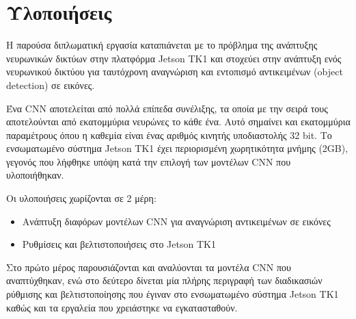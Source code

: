 \chapter{Υλοποιήσεις}
\label{chapter:implementations}

Η παρούσα διπλωματική εργασία καταπιάνεται με το
πρόβλημα της ανάπτυξης νευρωνικών δικτύων στην πλατφόρμα Jetson TK1
και στοχεύει στην ανάπτυξη ενός νευρωνικού δικτύου για ταυτόχρονη
αναγνώριση και εντοπισμό αντικειμένων (object detection) σε εικόνες.

Ένα CNN αποτελείται από πολλά επίπεδα συνέλιξης, τα οποία με την σειρά τους
αποτελούνται από εκατομμύρια νευρώνες το κάθε ένα. Αυτό σημαίνει και εκατομμύρια
παραμέτρους όπου η καθεμία είναι ένας αριθμός κινητής υποδιαστολής 32 bit.
Το ενσωματωμένο σύστημα Jetson TK1 έχει περιορισμένη χωρητικότητα μνήμης (2GB),
γεγονός που λήφθηκε υπόψη κατά την επιλογή των μοντέλων CNN που υλοποιήθηκαν.

Οι υλοποιήσεις χωρίζονται σε 2 μέρη:
\begin{itemize}
  \item{Ανάπτυξη διαφόρων μοντέλων CNN για αναγνώριση αντικειμένων σε εικόνες}
  \item{Ρυθμίσεις και βελτιστοποιήσεις στο Jetson TK1}
\end{itemize}

Στο πρώτο μέρος παρουσιάζονται και αναλύονται τα μοντέλα CNN που αναπτύχθηκαν, ενώ στο
δεύτερο δίνεται μία πλήρης περιγραφή των διαδικασιών ρύθμισης και βελτιστοποίησης που έγιναν
στο ενσωματωμένο σύστημα Jetson TK1 καθώς και τα εργαλεία που χρειάστηκε να εγκατασταθούν.





